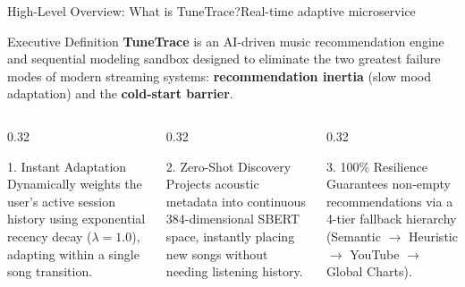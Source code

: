 \documentclass[aspectratio=169,10pt]{beamer}
\begin{document}
\begin{frame}{High-Level Overview: What is TuneTrace?}{Real-time adaptive microservice}
    \begin{block}{Executive Definition}
        \small \textbf{TuneTrace} is an AI-driven music recommendation engine and sequential modeling sandbox designed to eliminate the two greatest failure modes of modern streaming systems: \textbf{recommendation inertia} (slow mood adaptation) and the \textbf{cold-start barrier}.
    \end{block}

    \vspace{0.15cm}
    \begin{columns}[T]
        \begin{column}{0.32\textwidth}
            \begin{block}{1. Instant Adaptation}
                \fontsize{6.5pt}{8.5pt}\selectfont
                Dynamically weights the user's active session history using exponential recency decay ($\lambda=1.0$), adapting within a single song transition.
            \end{block}
        \end{column}

        \begin{column}{0.32\textwidth}
            \begin{block}{2. Zero-Shot Discovery}
                \fontsize{6.5pt}{8.5pt}\selectfont
                Projects acoustic metadata into continuous 384-dimensional SBERT space, instantly placing new songs without needing listening history.
            \end{block}
        \end{column}

        \begin{column}{0.32\textwidth}
            \begin{block}{3. 100\% Resilience}
                \fontsize{6.5pt}{8.5pt}\selectfont
                Guarantees non-empty recommendations via a 4-tier fallback hierarchy (Semantic $\to$ Heuristic $\to$ YouTube $\to$ Global Charts).
            \end{block}
        \end{column}
    \end{columns}
\end{frame}
\end{document}

